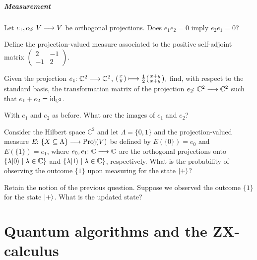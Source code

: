 \documentclass[a4paper, oneside, 12pt]{amsart}
\begin{document}
\subsubsection*{Measurement}
\begin{thmlist}
  \item Let \(e_{1}, e_{2} \from V\to V\) be orthogonal projections. Does \(e_{1} e_{2} = 0 \) imply \(e_{2} e_{1}=0\)?
  \item Define the projection-valued measure associated to the positive self-adjoint matrix \(
  \begin{pmatrix}
    2 & -1 \\  -1 & 2
  \end{pmatrix}
  \).
  \item Given the projection \(e_{1} \from \mathbb{C}^{2} \to \mathbb{C}^{2}\), \(
  \begin{psmallmatrix}
    x\\ y
  \end{psmallmatrix}
  \mapsto \tfrac{1}{2}
  \begin{psmallmatrix}
    x + y \\ x + y
  \end{psmallmatrix},
  \)
  find, with respect to the standard basis, the transformation matrix of the projection \(e_{2} \from \mathbb{C}^{2} \to \mathbb{C}^{2}\) such that \(e_{1} + e_{2} = \id_{ \mathbb{C}^{2}}\).
  \item With \(e_{1}\) and \(e_{2}\) as before. What are the images of \(e_{1}\) and \(e_{2}\)?
  \item Consider the Hilbert space \( \mathbb{C}^{2}\) and let \(\Lambda =\{0,1\}\) and the projection-valued measure \( E \from\{X \subseteq \Lambda\} \to \mathrm{Proj}(V)\) be defined by \(E(\{0\}) =e_{0}\) and \(E(\{1\}) =e_{1}\), where \(e_{0}, e_{1} \from \mathbb{C}\to \mathbb{C}\) are the orthogonal projections onto \(\{\lambda \ket{0} \mid \lambda \in \mathbb{C}\}\) and \(\{ \lambda \ket{1} \mid \lambda \in \mathbb{C}\}\), respectively.
  What is the probability of observing the outcome \(\{1\}\) upon measuring for the state \(\ket{+}\)?
 \item Retain the notion of the previous question. Suppose we observed  the outcome \(\{1\}\) for the state \(\ket{+}\). What is the updated state?
\end{thmlist}


\cleardoublepage
\part{Quantum algorithms and the ZX-calculus}
\end{document}
